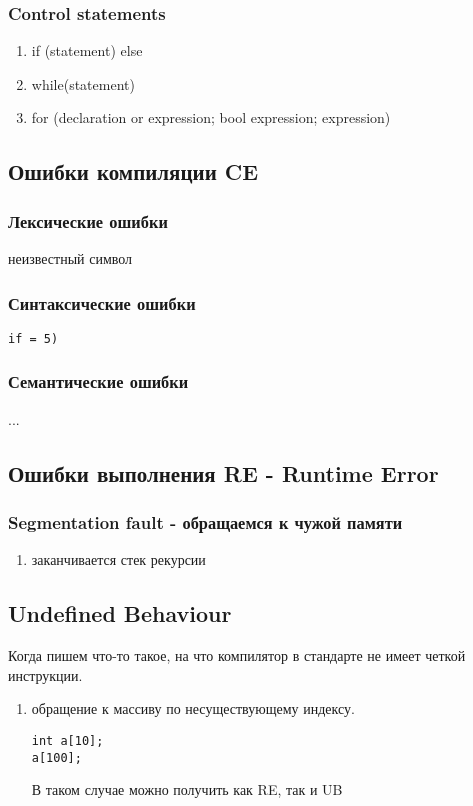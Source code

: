 \documentclass[12pt, a5paper]{article}
\begin{document}
\subsubsection{Control statements}

\begin{enumerate}
	\item if (statement) {} else {}
	\item while(statement){}
	\item for (declaration or expression; bool expression; expression){}
\end{enumerate}

\subsection{Ошибки компиляции CE}
\subsubsection{Лексические ошибки} неизвестный символ
\subsubsection{Синтаксические ошибки} \texttt{if = 5)}
\subsubsection{Семантические ошибки} ...

\subsection{Ошибки выполнения RE - Runtime Error}
\subsubsection{Segmentation fault - обращаемся к чужой памяти} 
\begin{enumerate}
\item заканчивается стек рекурсии
\end{enumerate}

\subsection{Undefined Behaviour} 
Когда пишем что-то такое, на что компилятор в стандарте не имеет четкой инструкции.

\begin{enumerate}
\item обращение к массиву по несуществующему индексу. 
\begin{lstlisting}
int a[10];
a[100]; 
\end{lstlisting}
	В таком случае можно получить как RE, так и UB 
\end{enumerate}
\end{document}
